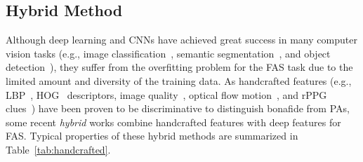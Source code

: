 \documentclass[10pt,journal,compsoc]{IEEEtran}
\begin{document}
\subsection{Hybrid Method}
Although deep learning and CNNs have achieved great success in many computer vision tasks (e.g., image classification~\cite{He2015Deep,huang2017densely}, semantic segmentation~\cite{long2015fully}, and object detection~\cite{ren2016faster}), they suffer from the overfitting problem for the FAS task due to the limited amount and diversity of the training data. As handcrafted features (e.g., LBP~\cite{ahonen2006face}, HOG~\cite{dalal2005histograms} descriptors, image quality~\cite{galbally2014face}, optical flow motion~\cite{brox2010large}, and rPPG clues~\cite{niu2020video}) have been proven to be discriminative to distinguish bonafide from PAs, some recent \textit{hybrid} works combine handcrafted features with deep features for FAS. Typical properties of these hybrid methods are summarized in Table~\ref{tab:handcrafted}.
\end{document}
